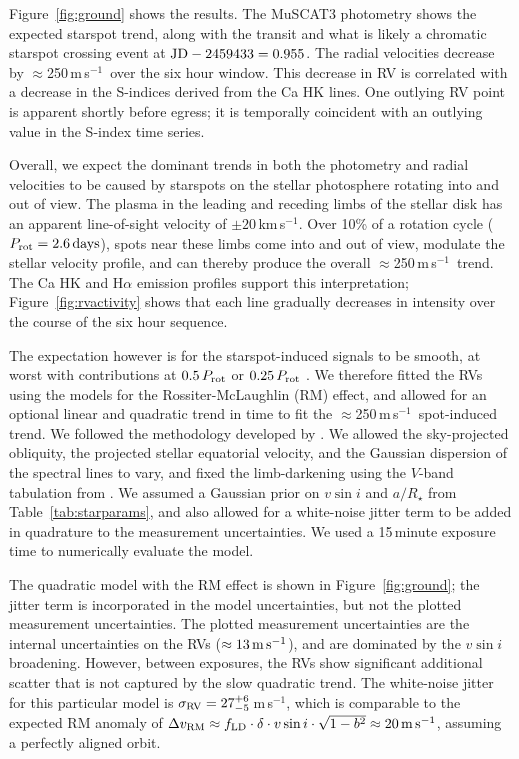\documentclass[12pt,modern,twocolumn,tighten,linenumbers]{aastex63}
\newcommand{\kms}{\,km\,s$^{-1}$}
\newcommand{\ms}{\,m\,s$^{-1}$}
\begin{document}
Figure~\ref{fig:ground} shows the results.  The MuSCAT3 photometry
shows the expected starspot trend, along with the transit and what is
likely a chromatic starspot crossing event at ${\rm JD} - 2459433 =
0.955$.  The radial velocities decrease by $\approx$250\ms\ over the
six hour window.  This decrease in RV is correlated with a decrease in
the S-indices derived from the Ca HK lines.  One outlying RV point is
apparent shortly before egress; it is temporally coincident with an
outlying value in the S-index time series.

Overall, we expect the dominant trends in both the photometry and
radial velocities to be caused by starspots on the stellar photosphere
rotating into and out of view.  The plasma in the leading and receding
limbs of the stellar disk has an apparent line-of-sight velocity of
$\pm 20$\kms.  Over 10\% of a rotation cycle ($P_{\rm rot}=2.6\,{\rm
days}$), spots near these limbs come into and out of view, modulate
the stellar velocity profile, and can thereby produce the overall
$\approx$250\ms\ trend.  The Ca HK and H$\alpha$ emission profiles
support this interpretation; Figure~\ref{fig:rvactivity} shows that
each line gradually decreases in intensity over the course of the six
hour sequence.

The expectation however is for the starspot-induced signals to be
smooth, at worst with contributions at $0.5\,P_{\rm rot}$ or
$0.25\,P_{\rm rot}$ \citep{klein_simulated_2020}.  We therefore fitted
the RVs using the \citet{hirano_analytic_2010,hirano_2011} models for
the Rossiter-McLaughlin (RM) effect, and allowed for an optional
linear and quadratic trend in time to fit the $\approx$250\ms\
spot-induced trend.  We followed the methodology developed by
\citet{stefansson_2020}.  We allowed the sky-projected obliquity, the
projected stellar equatorial velocity, and the Gaussian dispersion of
the spectral lines to vary, and fixed the limb-darkening using the
$V$-band tabulation from \citet{claret_gravity_2011}.  We assumed a
Gaussian prior on $v\sin i$ and $a/R_\star$ from
Table~\ref{tab:starparams}, and also allowed for a white-noise jitter
term to be added in quadrature to the measurement uncertainties.  We
used a 15\,minute exposure time to numerically evaluate the model.

The quadratic model with the RM effect is shown in
Figure~\ref{fig:ground}; the jitter term is incorporated in the model
uncertainties, but not the plotted measurement uncertainties.  The
plotted measurement uncertainties are the internal uncertainties on
the RVs ($\approx 13\,{\rm m\,s}^{-1}$), and are dominated by the
$v\sin i$ broadening.  However, between exposures, the RVs show
significant additional scatter that is not captured by the slow
quadratic trend.  The white-noise jitter for this particular model is
$\sigma_{\rm RV} = 27^{+6}_{-5}$\ms, which is comparable to the
expected RM anomaly of $\Delta v_{\rm RM} \approx f_{\rm LD} \cdot
\delta \cdot v\sin i \cdot \sqrt{1-b^2} \approx 20\,{\rm m\,s}^{-1}$,
assuming a perfectly aligned orbit.
\end{document}
